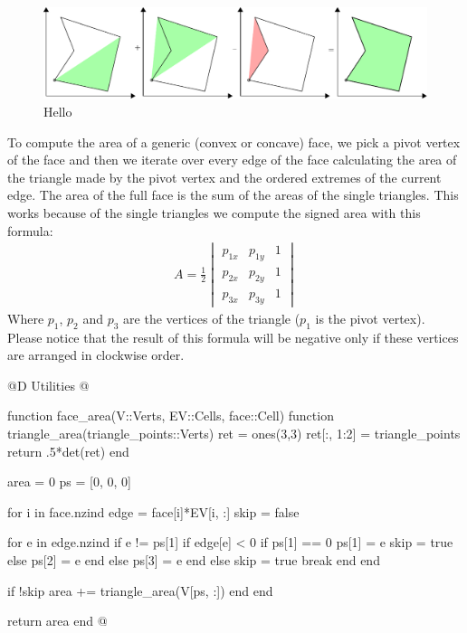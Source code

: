 \begin{figure}[h]
    \includegraphics[width=\textwidth]{./img/ch5-1.pdf}
    \caption{Hello}
\end{figure}
\noindent
To compute the area of a generic (convex or concave) face,
we pick a pivot vertex of the face and then we iterate over
every edge of the face calculating the area of the triangle
made by the pivot vertex and the ordered extremes of the current edge.
The area of the full face is the sum of the areas of the single triangles.
This works because of the single triangles we compute the signed area with
this formula:
\begin{gather*}
    A = \frac{1}{2}
    \begin{vmatrix}
        p_{1x} & p_{1y} & 1 \\
        p_{2x} & p_{2y} & 1 \\
        p_{3x} & p_{3y} & 1
    \end{vmatrix}
\end{gather*}
Where $p_1$, $p_2$ and $p_3$ are the vertices of the triangle ($p_1$ is the pivot vertex). 
Please notice that the result of this formula will be negative only if these vertices 
are arranged in clockwise order.

@D Utilities
@{function face_area(V::Verts, EV::Cells, face::Cell)
    function triangle_area(triangle_points::Verts)
        ret = ones(3,3)
        ret[:, 1:2] = triangle_points
        return .5*det(ret)
    end

    area = 0
    ps = [0, 0, 0]

    for i in face.nzind
        edge = face[i]*EV[i, :]
        skip = false

        for e in edge.nzind
            if e != ps[1]
                if edge[e] < 0
                    if ps[1] == 0
                        ps[1] = e
                        skip = true
                    else
                        ps[2] = e
                    end
                else
                    ps[3] = e
                end
            else
                skip = true
                break
            end
        end

        if !skip
            area += triangle_area(V[ps, :])
        end
    end

    return area
end
@}

